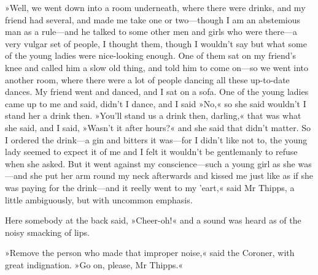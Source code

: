»Well, we went down into a room underneath, where there were drinks, and my friend had several, and made me take one or two\allowbreak---\allowbreak though I am an abstemious man as a rule\allowbreak---\allowbreak and he talked to some other men and girls who were there\allowbreak---\allowbreak a very vulgar set of people, I thought them, though I wouldn't say but what some of the young ladies were nice-looking enough. One of them sat on my friend's knee and called him a slow old thing, and told him to come on\allowbreak---\allowbreak so we went into another room, where there were a lot of people dancing all these up-to-date dances. My friend went and danced, and I sat on a sofa. One of the young ladies came up to me and said, didn't I dance, and I said »No,« so she said wouldn't I stand her a drink then. »You'll stand us a drink then, darling,« that was what she said, and I said, »Wasn't it after hours?« and she said that didn't matter. So I ordered the drink\allowbreak---\allowbreak a gin and bitters it was\allowbreak---\allowbreak for I didn't like not to, the young lady seemed to expect it of me and I felt it wouldn't be gentlemanly to refuse when she asked. But it went against my conscience\allowbreak---\allowbreak such a young girl as she was\allowbreak---\allowbreak and she put her arm round my neck afterwards and kissed me just like as if she was paying for the drink\allowbreak---\allowbreak and it reelly went to my 'eart,« said Mr Thipps, a little ambiguously, but with uncommon emphasis.

Here somebody at the back said, »Cheer-oh!« and a sound was heard as of the noisy smacking of lips.

»Remove the person who made that improper noise,« said the Coroner, with great indignation. »Go on, please, Mr Thipps.«

